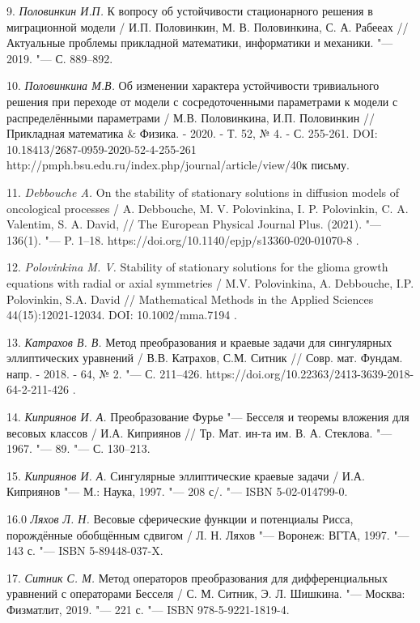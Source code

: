 
9. {\it Половинкин И.П.} К вопросу об устойчивости стационарного
решения в миграционной модели / И.П. Половинкин, М. В.
Половинкина, С. А. Рабееах // Актуальные проблемы прикладной
математики, информатики и механики. "--- 2019. "--- С. 889--892.

10. {\it Половинкина М.В.} Об изменении характера устойчивости
тривиального решения при переходе от модели с сосредоточенными
параметрами к модели с распределёнными параметрами / М.В.
Половинкина, И.П. Половинкин // Прикладная математика $\&$ Физика.
- 2020. -  Т. 52, № 4. - С. 255-261. DOI:
10.18413/2687-0959-2020-52-4-255-261
http://pmph.bsu.edu.ru/index.php/journal/article/view/40к письму.



11. {\it Debbouche A.} On the stability of stationary solutions in
diffusion models of oncological processes / A. Debbouche, M. V.
Polovinkina, I. P. Polovinkin, C. A. Valentim, S. A. David, // The
European Physical Journal Plus. (2021). "--- 136(1). "--- P. 1--18.
https://doi.org/10.1140/epjp/s13360-020-01070-8 .

12. {\it  Polovinkina M. V.} Stability of stationary solutions for
the glioma growth equations with radial or axial symmetries / M.V.
Polovinkina, A. Debbouche, I.P. Polovinkin, S.A. David //
Mathematical Methods in the Applied Sciences 44(15):12021-12034.
DOI: 10.1002/mma.7194 .


13. {\it Катрахов В. В.} Метод преобразования и краевые задачи для
сингулярных эллиптических уравнений / В.В. Катрахов, С.М. Ситник
// Совр. мат. Фундам. напр. - 2018. - 64, № 2. "--- С. 211--426.
https://doi.org/10.22363/2413-3639-2018-64-2-211-426 .

14. {\it Киприянов И. А.} Преобразование Фурье "--- Бесселя и
теоремы вложения для весовых классов / И.А. Киприянов // Тр. Мат.
ин-та им. В. А. Стеклова. "--- 1967. "--- 89. "--- С. 130--213.

15. {\it Киприянов И. А.} Сингулярные эллиптические краевые задачи
/ И.А. Киприянов "--- М.: Наука, 1997. "--- 208 с/. "--- ISBN
5-02-014799-0.

16.0 {\it Ляхов Л. Н.} Весовые сферические функции и потенциалы
Рисса, порождённые обобщённым сдвигом / Л. Н. Ляхов "--- Воронеж:
ВГТА, 1997. "--- 143 с. "--- ISBN 5-89448-037-X.

17. {\it Ситник С. М.} Метод операторов преобразования для
дифференциальных уравнений с операторами Бесселя / С. М. Ситник,
Э. Л. Шишкина. "--- Москва: Физматлит, 2019. "--- 221 с. "--- ISBN
978-5-9221-1819-4.